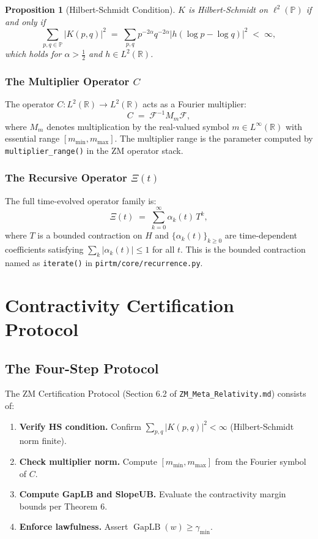 \documentclass[12pt,letterpaper]{article}
\newtheorem{proposition}[theorem]{Proposition}
\theoremstyle{definition}
\theoremstyle{remark}
\begin{document}
\begin{proposition}[Hilbert-Schmidt Condition]
$K$ is Hilbert-Schmidt on $\ell^2(\mathbb{P})$ if and only if
\[
  \sum_{p,q \in \mathbb{P}} |K(p,q)|^2
  \;=\; \sum_{p,q} p^{-2\alpha} q^{-2\alpha} |h(\log p - \log q)|^2
  \;<\; \infty,
\]
which holds for $\alpha > \frac{1}{2}$ and $h \in L^2(\mathbb{R})$.
\end{proposition}

\subsubsection{The Multiplier Operator $C$}

The operator $C \colon L^2(\mathbb{R}) \to L^2(\mathbb{R})$ acts as a
Fourier multiplier:
\[
  C \;=\; \mathcal{F}^{-1} M_m \mathcal{F},
\]
where $M_m$ denotes multiplication by the real-valued symbol $m \in L^\infty(\mathbb{R})$
with essential range $[m_{\min}, m_{\max}]$. The multiplier range is the
parameter computed by \texttt{multiplier\_range()} in the ZM operator stack.

\subsubsection{The Recursive Operator \texorpdfstring{$\Xi(t)$}{Xi(t)}}

The full time-evolved operator family is:
\[
  \Xi(t) \;=\; \sum_{k=0}^{\infty} \alpha_k(t)\, T^k,
\]
where $T$ is a bounded contraction on $H$ and $\{\alpha_k(t)\}_{k \geq 0}$
are time-dependent coefficients satisfying $\sum_k |\alpha_k(t)| \leq 1$ for
all $t$. This is the bounded contraction named as \texttt{iterate()} in
\texttt{pirtm/core/recurrence.py}.

\section{Contractivity Certification Protocol}
\label{sec:cert}

\subsection{The Four-Step Protocol}

The ZM Certification Protocol (Section 6.2 of \texttt{ZM\_Meta\_Relativity.md})
consists of:

\begin{enumerate}[label=\textbf{Step \arabic*.}, leftmargin=*]
  \item \textbf{Verify HS condition.}
        Confirm $\sum_{p,q} |K(p,q)|^2 < \infty$
        (Hilbert-Schmidt norm finite).
  \item \textbf{Check multiplier norm.}
        Compute $[m_{\min}, m_{\max}]$ from the Fourier symbol of $C$.
  \item \textbf{Compute GapLB and SlopeUB.}
        Evaluate the contractivity margin bounds per Theorem 6.
  \item \textbf{Enforce lawfulness.}
        Assert $\operatorname{GapLB}(w) \geq \gamma_{\min}$.
\end{enumerate}
\end{document}
